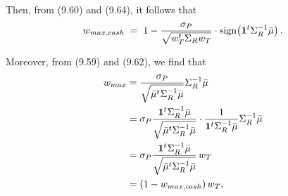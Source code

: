 Then, from (9.60) and (9.64), it follows that
\begin{equation}
w_{max,cash} \;=\; 1-\frac{\sigma_P}{\sqrt{w_T^t\Sigma_Rw_T}}\cdot
\operatorname{sign}\!\left(\mathbf{1}^t\Sigma_R^{-1}\bar\mu\right).
\end{equation}

Moreover, from (9.59) and (9.62), we find that
\begin{align}
w_{max} &= \frac{\sigma_P}{\sqrt{\bar\mu^t\Sigma_R^{-1}\bar\mu}}\Sigma_R^{-1}\bar\mu
\notag\\
&= \sigma_P\frac{\mathbf{1}^t\Sigma_R^{-1}\bar\mu}{\sqrt{\bar\mu^t\Sigma_R^{-1}\bar\mu}}
\cdot\frac{1}{\mathbf{1}^t\Sigma_R^{-1}\bar\mu}\Sigma_R^{-1}\bar\mu \notag\\
&= \sigma_P\frac{\mathbf{1}^t\Sigma_R^{-1}\bar\mu}{\sqrt{\bar\mu^t\Sigma_R^{-1}\bar\mu}}\,w_T
\notag\\
&= (1-w_{max,cash})\,w_T,
\end{align}
